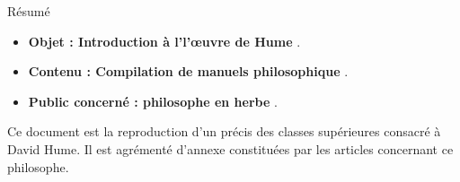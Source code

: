 \begin{center}
\Large
Résumé
\normalsize
\end{center}
\vspace{3cm}
\begin{itemize}[leftmargin=1cm, label=, itemsep=21pt]
\item {\bf Objet : Introduction à l'l’œuvre de Hume} .
\item {\bf Contenu : Compilation de manuels philosophique} .
\item {\bf Public concerné : philosophe en herbe} .
\end{itemize}

\vspace{3cm}

Ce document est la reproduction d'un précis des classes supérieures consacré à David Hume. Il est agrémenté d'annexe constituées par les articles concernant ce philosophe.

\vspace{3cm}

